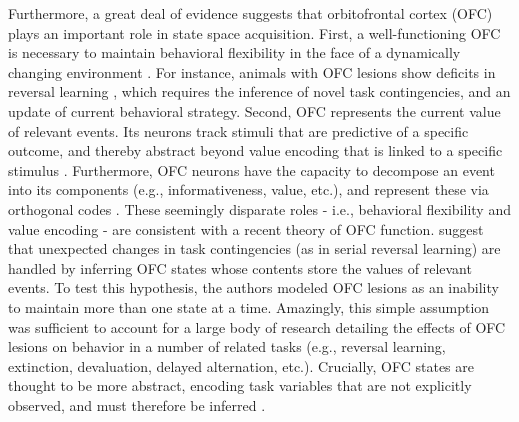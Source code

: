 \documentclass[11pt]{article}
\let\cite=\citep
\let\citeN=\citet
\begin{document}
Furthermore, a great deal of evidence suggests that orbitofrontal cortex (OFC) 
plays an important role in state space acquisition. First, a well-functioning 
OFC is necessary to maintain behavioral flexibility in the face of a 
dynamically changing environment \cite{Bechara1994}. For instance, animals with 
OFC lesions show deficits in reversal learning 
\cite{Schoenbaum2003a,Delameter2007}, which requires the inference of novel task 
contingencies, and an update of current behavioral strategy. Second, OFC 
represents the current value of relevant events. Its neurons track stimuli that 
are predictive of a specific outcome, and thereby abstract beyond value 
encoding that is linked to a specific stimulus 
\cite{Schoenbaum1998,Baxter2000,Schoenbaum2003b}. Furthermore, OFC neurons have 
the capacity to decompose an event into its components (e.g., informativeness, 
value, etc.), and represent these via orthogonal codes \cite{Blanchard2015}. 
These seemingly disparate roles - i.e., behavioral flexibility and value 
encoding - are consistent with a recent theory of OFC function. 
\citeN{Wilson2014} suggest that unexpected changes in task contingencies (as 
in serial reversal learning) are handled by inferring OFC states whose contents 
store the values of relevant events. To test this hypothesis, the authors 
modeled OFC lesions as an inability to maintain more than one state at a time. 
Amazingly, this simple assumption was sufficient to account for a large body of 
research detailing the effects of OFC lesions on behavior in a number of 
related tasks (e.g., reversal learning, extinction, devaluation, delayed 
alternation, etc.). Crucially, OFC states are thought to be more abstract, 
encoding task variables that are not explicitly observed, and must therefore be 
inferred \cite{Bradfield2015,Stalnaker2015}.
\end{document}
